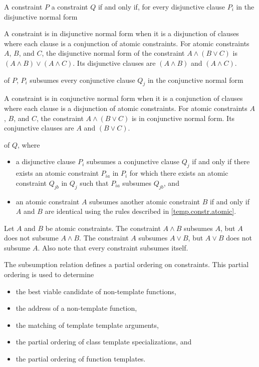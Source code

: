 \pnum
A constraint $P$  a constraint $Q$
if and only if,
for every disjunctive clause $P_i$
in the disjunctive normal form
\begin{footnote}
A constraint is in disjunctive normal form when it is a disjunction of
clauses where each clause is a conjunction of atomic constraints.
For atomic constraints $A$, $B$, and $C$, the disjunctive normal form
of the constraint
$A \land (B \lor C)$
is
$(A \land B) \lor (A \land C)$.
%
Its disjunctive clauses are $(A \land B)$ and $(A \land C)$.
\end{footnote}
of $P$, $P_i$ subsumes every conjunctive clause $Q_j$
in the conjunctive normal form
\begin{footnote}
A constraint is in conjunctive normal form when it is a conjunction
of clauses where each clause is a disjunction of atomic constraints.
For atomic constraints $A$, $B$, and $C$, the constraint
$A \land (B \lor C)$ is in conjunctive normal form.
%
Its conjunctive clauses are $A$ and $(B \lor C)$.
\end{footnote}
of $Q$, where
\begin{itemize}
\item
a disjunctive clause $P_i$ subsumes a conjunctive clause $Q_j$ if and only
if there exists an atomic constraint $P_{ia}$ in $P_i$ for which there exists
an atomic constraint $Q_{jb}$ in $Q_j$ such that $P_{ia}$ subsumes $Q_{jb}$, and

\item an atomic constraint $A$ subsumes another atomic constraint
$B$ if and only if $A$ and $B$ are identical using the
rules described in \ref{temp.constr.atomic}.
\end{itemize}
%
\begin{example}
Let $A$ and $B$ be atomic constraints.
%
The constraint $A \land B$ subsumes $A$, but $A$ does not subsume $A \land B$.
%
The constraint $A$ subsumes $A \lor B$, but $A \lor B$ does not subsume $A$.
%
Also note that every constraint subsumes itself.
\end{example}

\pnum
\begin{note}
The subsumption relation defines a partial ordering on constraints.
This partial ordering is used to determine
\begin{itemize}
\item the best viable candidate of non-template functions,
\item the address of a non-template function,
\item the matching of template template arguments,
\item the partial ordering of class template specializations, and
\item the partial ordering of function templates.
\end{itemize}
\end{note}

